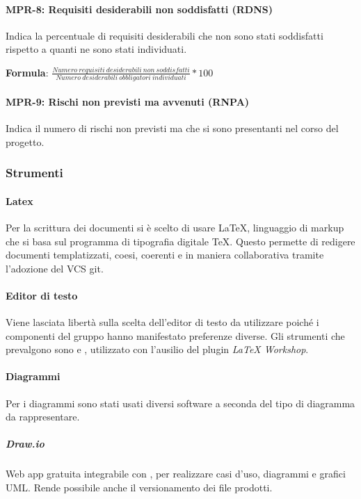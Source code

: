 \paragraph{MPR-8: Requisiti desiderabili non soddisfatti (RDNS)} \label{_MPR-8}
Indica la percentuale di requisiti desiderabili che non sono stati  soddisfatti rispetto a quanti ne sono stati individuati.
\begin{center}
    \item \textbf{Formula}: \(\frac{Numero\ requisiti\ desiderabili\ non\ soddisfatti}{Numero\ desiderabili\  obbligatori\ individuati}*100\)
\end{center}

\paragraph{MPR-9: Rischi non previsti ma avvenuti (RNPA)} \label{_MPR-9}
Indica il numero di rischi non previsti ma che si sono presentanti nel corso del progetto.


\subsubsection{Strumenti}
\paragraph{Latex}
Per la scrittura dei documenti si è scelto di usare \LaTeX, linguaggio di markup che si basa sul programma di tipografia digitale \TeX . Questo permette di redigere documenti templatizzati, coesi, coerenti e in maniera collaborativa tramite l'adozione del VCS git.

\paragraph{Editor di testo}
Viene lasciata libertà sulla scelta dell'editor di testo da utilizzare poiché i componenti del gruppo hanno manifestato preferenze diverse. Gli strumenti che prevalgono sono \textit{} e \textit{}, utilizzato con l'ausilio del plugin \textit{LaTeX Workshop}.

\paragraph{Diagrammi}
Per i diagrammi sono stati usati diversi software a seconda del tipo di diagramma da rappresentare.

\subparagraph{\textit{Draw.io}}
Web app gratuita integrabile con , per realizzare casi d'uso, diagrammi e grafici UML. Rende possibile anche il versionamento dei file prodotti.

